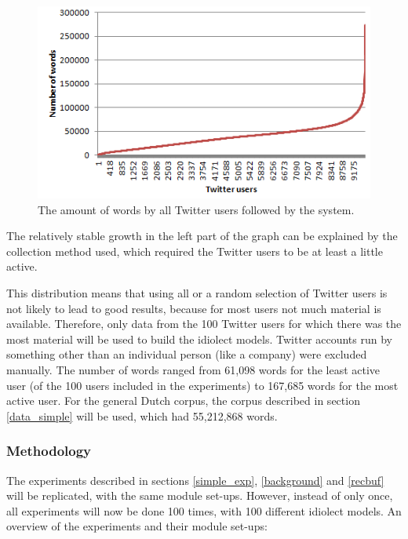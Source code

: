 \documentclass[12pt]{article}
\begin{document}
\begin{figure}[H] \centering
\includegraphics[scale=1]{zipf_twitter}
\caption{The amount of words by all Twitter users followed by the system.}
\label{lcurve}
\end{figure} 

The relatively stable growth in the left part of the graph can be explained by the collection method used, which required the Twitter users to be at least a little active. 

This distribution means that using all or a random selection of Twitter users is not likely to lead to good results, because for most users not much material is available. Therefore, only data from the 100 Twitter users for which there was the most material will be used to build the idiolect models. Twitter accounts run by something other than an individual person (like a company) were excluded manually. The number of words ranged from 61,098 words for the least active user (of the 100 users included in the experiments) to 167,685 words for the most active user. For the general Dutch corpus, the corpus described in section \ref{data_simple} will be used, which had 55,212,868 words.

\subsubsection{Methodology}

The experiments described in sections \ref{simple_exp}, \ref{background} and \ref{recbuf} will be replicated, with the same module set-ups. However, instead of only once, all experiments will now be done 100 times, with 100 different idiolect models. An overview of the experiments and their module set-ups:
\end{document}
